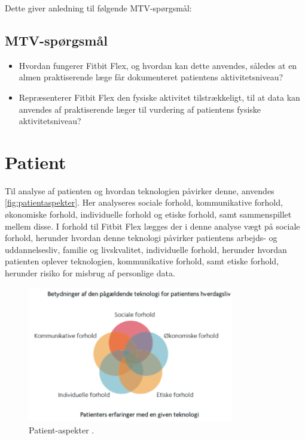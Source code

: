\noindent
Dette giver anledning til følgende MTV-spørgsmål: 
\subsection{MTV-spørgsmål}
\begin{itemize}
\item Hvordan fungerer Fitbit Flex, og hvordan kan dette anvendes, således at en almen praktiserende læge får dokumenteret patientens aktivitetsniveau?
\item Repræsenterer Fitbit Flex den fysiske aktivitet tilstrækkeligt, til at data kan anvendes af praktiserende læger til vurdering af patientens fysiske aktivitetsniveau?
\end{itemize}

\section{Patient}\label{sec:metode_pat}
Til analyse af patienten og hvordan teknologien påvirker denne, anvendes \autoref{fig:patientaspekter}. Her analyseres sociale forhold, kommunikative forhold, økonomiske forhold, individuelle forhold og etiske forhold, samt sammenspillet mellem disse. I forhold til Fitbit Flex lægges der i denne analyse vægt på sociale forhold, herunder hvordan denne teknologi påvirker patientens arbejds- og uddannelsesliv, familie og livskvalitet, individuelle forhold, herunder hvordan patienten oplever teknologien, kommunikative forhold, samt etiske forhold, herunder risiko for misbrug af personlige data. 


\begin{figure}[H]
\centering
\includegraphics[width=0.8\textwidth]{figures/patientaspekter}
\caption{Patient-aspekter \citep{mtvhaandbog}.}
\label{fig:patientaspekter}
\end{figure}

